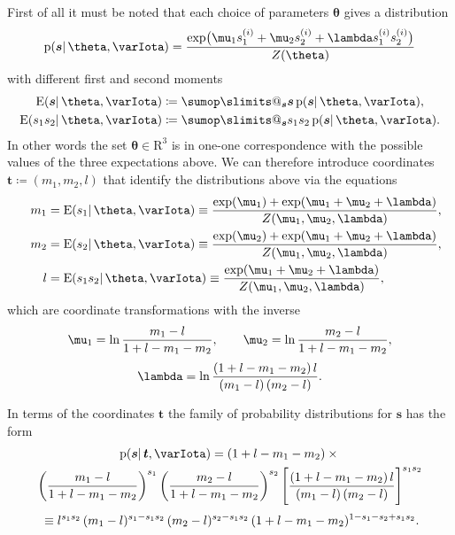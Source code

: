 \documentclass[\ifafour a4paper,12pt,\else a5paper,10pt,\fi%
onecolumn,oneside,article,%
british%
]{memoir}
\makeatletter
\theoremstyle{remark}
\theoremstyle{innote}
\def\sum{\DOTSI\sumop\slimits@}
\newcommand*{\RR}{\bm{\mathrm{R}}}
\newcommand*{\defd}{\coloneqq}
\newcommand*{\pf}{\mathrm{p}}%
\renewcommand*{\|}{\mathpunct{|}}
\newcommand*{\E}{\mathrm{E}}
\DeclarePairedDelimiter\expp{(}{)}
\newcommand*{\expe}{\E\expp}%
\newcommand*{\yI}{\varIota}
\newcommand*{\ys}{\bm{s}}
\newcommand*{\ysso}[1]{s^{(#1)}}
\newcommand*{\la}{\lambda}
\newcommand*{\yth}{\bm{\theta}}
\newcommand*{\yt}{\bm{t}}
\makeatother
\begin{document}
First of all it must be noted that each choice of parameters $\yth$ gives
a distribution
\begin{equation}
  \label{eq:distr_simple_s}
  \pf(\ys \|\yth, \yI)
  =
  \frac{  \exp\bigl(
      \mu_1 \ysso{i}_1 + \mu_2 \ysso{i}_2 + \la \ysso{i}_1 \ysso{i}_2
      \bigr) }{Z(\yth)}
\end{equation}
with different first and second moments
\begin{equation}
  \label{eq:moments}
  \begin{aligned}
    \expe{\ys \|\yth, \yI} &\defd
    \sum_{\ys} \ys\, \pf(\ys \|\yth, \yI),
\\
    \expe{s_1 s_2 \|\yth, \yI} &\defd
    \sum_{\ys} s_1 s_2\, \pf(\ys \|\yth, \yI).
  \end{aligned}
\end{equation}
In other words the set $\yth \in \RR^3$ is in one-one correspondence with
the possible values of the three expectations above. We can therefore
introduce coordinates $\yt \defd (m_1, m_2, l)$ that identify the
distributions above via the equations
\begin{equation}
  \label{eq:tranf_coord}
  \begin{split}
  m_1 &= \expe{s_1 \|\yth, \yI} \equiv
  \frac{\exp(\mu_1) + \exp(\mu_1 + \mu_2 + \la)}{Z(\mu_1,\mu_2,\la)},\\
  m_2 &= \expe{s_2 \|\yth, \yI} \equiv
  \frac{\exp(\mu_2) + \exp(\mu_1 + \mu_2 + \la)}{Z(\mu_1,\mu_2,\la)},\\
  \qquad
  l &= \expe{s_1 s_2 \|\yth, \yI} \equiv
  \frac{\exp(\mu_1 + \mu_2 + \la)}{Z(\mu_1,\mu_2,\la)},
\end{split}
\end{equation}
which are coordinate transformations with the inverse
\begin{equation}
  \label{eq:inverse_tranf_coord}
  \begin{gathered}
    \mu_1 =\ln\frac{m_1-l}{1+l-m_1-m_2},\qquad
    \mu_2 =\ln\frac{m_2-l}{1+l-m_1-m_2},\\[\jot]
\la =\ln\frac{(1+l-m_1-m_2)\,l}{(m_1-l)\,(m_2-l)}.
\end{gathered}
\end{equation}

In terms of the coordinates $\yt$ the family of probability distributions
for $\ys$ has the form
\begin{multline}
  \label{eq:prob_family_m}
  \pf(\ys \| \yt,\yI) =
  (1+l-m_1-m_2)\times{}\\
  \biggl(\frac{m_1-l}{1+l-m_1-m_2} \biggr)^{s_1}\,
  \biggl( \frac{m_2-l}{1+l-m_1-m_2}  \biggr)^{s_2}\,
  \Biggl[ \frac{(1+l-m_1-m_2)\,l}{(m_1-l)\,(m_2-l)} \Biggr]^{s_1 s_2}
  \\[\jot]
  {}\equiv
  l^{s_1 s_2}\,
  (m_1-l)^{s_1-s_1 s_2}\,
  (m_2-l)^{s_2-s_1 s_2}\,
  (1+l-m_1-m_2)^{1-s_1-s_2+s_1 s_2}.
\end{multline}
\end{document}
